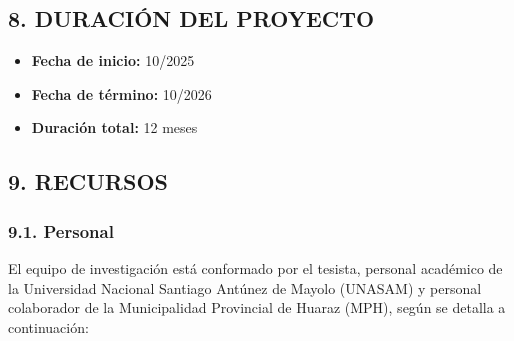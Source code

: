 \documentclass[12pt,a4paper]{article}
\begin{document}
\subsection*{8. DURACIÓN DEL PROYECTO}
\begin{itemize}[leftmargin=*]
    \item \textbf{Fecha de inicio:} 10/2025
    \item \textbf{Fecha de término:} 10/2026
    \item \textbf{Duración total:} 12 meses
\end{itemize}

\subsection*{9. RECURSOS}

\subsubsection*{9.1. Personal}

El equipo de investigación está conformado por el tesista,
personal académico de la Universidad Nacional Santiago Antúnez
de Mayolo (UNASAM) y personal colaborador de la Municipalidad
Provincial de Huaraz (MPH), según se detalla a continuación:
\end{document}
